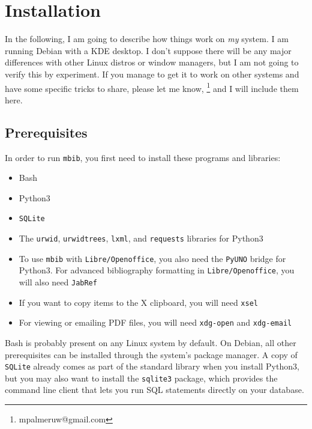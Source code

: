\documentclass[10pt]{article}
\newcommand*{\mbib}{\texttt{mbib}\xspace}
\newcommand*{\jabref}{\texttt{JabRef}\xspace}
\newcommand*{\loo}{\texttt{Libre\-/Open\-office}\xspace}
\newcommand*{\sqlite}{\texttt{SQLite}\xspace}
\begin{document}
\section{Installation}

In the following, I am going to describe how things work on \emph{my} system. I am running Debian with a KDE desktop. I don't suppose there will be any major differences with other Linux distros or window managers, but I am not going to verify this by experiment. If you manage to get it to work on other systems and have some specific tricks to share, please let me know,%
%
\footnote{mpalmeruw@gmail.com}
%
and I will include them here.

\subsection{Prerequisites}

In order to run \mbib, you first need to install these programs and libraries:

\begin{itemize}
\item Bash

\item Python3 

\item \sqlite

\item The \texttt{urwid}, \texttt{urwidtrees}, \texttt{lxml}, and \texttt{requests} libraries for Python3

\item To use \mbib with \loo, you also need the \texttt{PyUNO} bridge for Python3. For advanced bibliography formatting in \loo, you will also need \jabref

\item If you want to copy items to the X clipboard, you will need \texttt{xsel}

\item For viewing or emailing PDF files, you will need \texttt{xdg-open} and \texttt{xdg-email}
\end{itemize}

\noindent Bash is probably present on any Linux system by default. On Debian, all other prerequisites can be installed through the system's package manager. A copy of \sqlite already comes as part of the standard library when you install Python3, but you may also want to install the \texttt{sqlite3} package, which provides the command line client that lets you run SQL statements directly on your database. 
\end{document}
